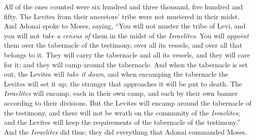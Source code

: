 \begin{biblechapter}
\verse All of the ones counted were six hundred and three thousand, five hundred and fifty.
\verse The Levites from their ancestors’ tribe were not mustered in their midst.
\verse And Adonai spoke to Moses, saying,
\verse “You will not muster the tribe of Levi, and you will not \textit{take a census of} them in the midst of the \textit{Israelites}.
\verse You will \textit{appoint} them over the tabernacle of the testimony, over all its vessels, and over all that belongs to it. They will carry the tabernacle and all its vessels, and they will care for it; and they will camp around the tabernacle.
\verse And when the tabernacle is set out, the Levites will \textit{take it down}, and when encamping the tabernacle the Levites will set it up; the stranger that approaches it will be put to death.
\verse The \textit{Israelites} will encamp, each in their own camp, and each by their own banner according to their divisions.
\verse But the Levites will encamp around the tabernacle of the testimony, and there will not be wrath on the community of the \textit{Israelites}; and the Levites will keep the requirements of the tabernacle of the testimony.”
\verse And the \textit{Israelites} did thus; they did everything that Adonai commanded Moses.
\end{biblechapter}

